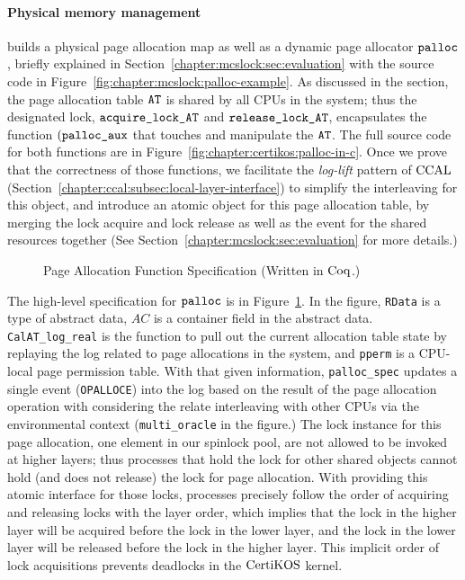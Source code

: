 \paragraph{Physical memory management}  builds a physical page allocation map as well as a dynamic page allocator ${\mathrm{\texttt{palloc}}}$, briefly explained 
in Section~\ref{chapter:mcslock:sec:evaluation} with the source code in Figure~\ref{fig:chapter:mcslock:palloc-example}.
As discussed in the section, the page allocation table ${\mathrm{\texttt{AT}}}$ is shared by 
all CPUs in the system; thus
the designated lock, ${\mathrm{\texttt{acquire\_lock\_AT}}}$ and  ${\mathrm{\texttt{release\_lock\_AT}}}$,
encapsulates the function $({\mathrm{\texttt{palloc\_aux}}}$ that touches and manipulate the ${\mathrm{\texttt{AT}}}$.
The full source code for both functions are in Figure~\ref{fig:chapter:certikos:palloc-in-c}.
Once we prove that the correctness of those functions, we facilitate 
the \textit{log-lift} pattern of $\mathrm{CCAL}$ (Section~\ref{chapter:ccal:subsec:local-layer-interface}) to simplify the interleaving for this object,
and introduce 
an atomic object for this page allocation table, by merging the lock acquire and lock release as well as 
the event for the shared resources together (See Section~\ref{chapter:mcslock:sec:evaluation} for more details.)
\begin{figure}
 
\caption{Page Allocation Function Specification (Written in $\mathrm{Coq}$.)}
\label{fig:chapter:certikos:palloc-in-coq}
\end{figure}
The high-level specification for ${\mathrm{\texttt{palloc}}}$ is in Figure~\ref{fig:chapter:certikos:palloc-in-coq}.
In the figure, \lstinline$RData$ is a type of abstract data, $AC$ is a container field in the abstract data. 
\lstinline$CalAT_log_real$ is the function to pull out the current allocation table state by replaying  the log
related to page allocations in the system, and \lstinline$pperm$ is a CPU-local page permission table. 
With that given information, \lstinline$palloc_spec$ updates a single event (\lstinline$OPALLOCE$) into the log based on the result of the page allocation operation with considering the relate interleaving with other CPUs via the environmental context (\lstinline$multi_oracle$ in the figure.)
The lock instance for this page allocation, one element in our spinlock pool, are not allowed to be invoked at higher layers;
thus processes that hold the lock for other shared objects 
cannot hold (and does not release) the lock for page allocation.
With providing this atomic interface for those locks,
processes precisely follow the order of acquiring and releasing locks with the layer order, which implies that 
the lock in the higher layer will be acquired before the lock in the lower layer,
and the lock in the lower layer will be released before the lock in the higher layer.
This implicit order of lock acquisitions prevents deadlocks in the $\mathrm{CertiKOS}$ kernel.


